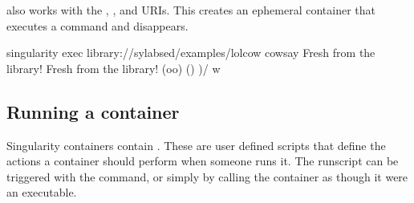 \documentclass[letterpaper,10pt,english]{sphinxmanual}
\begin{document}
 also works with the , , and 
URIs. This creates an ephemeral container that executes a command and
disappears.

%
\begin{sphinxVerbatim}[commandchars=\\\{\}]
\PYGZdl{} singularity exec library://sylabsed/examples/lolcow cowsay \PYGZdq{}Fresh from the library!\PYGZdq{}
 \PYGZus{}\PYGZus{}\PYGZus{}\PYGZus{}\PYGZus{}\PYGZus{}\PYGZus{}\PYGZus{}\PYGZus{}\PYGZus{}\PYGZus{}\PYGZus{}\PYGZus{}\PYGZus{}\PYGZus{}\PYGZus{}\PYGZus{}\PYGZus{}\PYGZus{}\PYGZus{}\PYGZus{}\PYGZus{}\PYGZus{}\PYGZus{}\PYGZus{}
\PYGZlt{} Fresh from the library! \PYGZgt{}
 \PYGZhy{}\PYGZhy{}\PYGZhy{}\PYGZhy{}\PYGZhy{}\PYGZhy{}\PYGZhy{}\PYGZhy{}\PYGZhy{}\PYGZhy{}\PYGZhy{}\PYGZhy{}\PYGZhy{}\PYGZhy{}\PYGZhy{}\PYGZhy{}\PYGZhy{}\PYGZhy{}\PYGZhy{}\PYGZhy{}\PYGZhy{}\PYGZhy{}\PYGZhy{}\PYGZhy{}\PYGZhy{}
        \PYGZbs{}   \PYGZca{}\PYGZus{}\PYGZus{}\PYGZca{}
         \PYGZbs{}  (oo)\PYGZbs{}\PYGZus{}\PYGZus{}\PYGZus{}\PYGZus{}\PYGZus{}\PYGZus{}\PYGZus{}
            (\PYGZus{}\PYGZus{})\PYGZbs{}       )\PYGZbs{}/\PYGZbs{}
                \textbar{}\textbar{}\PYGZhy{}\PYGZhy{}\PYGZhy{}\PYGZhy{}w \textbar{}
                \textbar{}\textbar{}     \textbar{}\textbar{}
\end{sphinxVerbatim}


\subsection{Running a container}
\label{\detokenize{quick_start:running-a-container}}
Singularity containers contain . These are user
defined scripts that define the actions a container should perform when someone
runs it. The runscript can be triggered with the 
command, or simply by  calling the container as though it were an executable.
\end{document}
